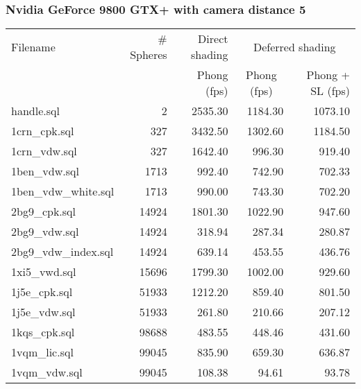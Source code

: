 \subsubsection*{Nvidia GeForce 9800 GTX+ with camera distance 5}
\begin{tabular}{|l|r|r|r|r|}
\hline
Filename & \# Spheres & Direct shading & \multicolumn{2}{|c|}{Deferred shading} \\
         &            & Phong (fps)    & \multicolumn{1}{|c}{Phong (fps)} & Phong + SL (fps) \\  
\hline
\hline
handle.sql & 2 & 2535.30 & 1184.30 & 1073.10 \\
\hline
1crn\_cpk.sql & 327 & 3432.50 & 1302.60 & 1184.50 \\
\hline
1crn\_vdw.sql & 327 & 1642.40 & 996.30 & 919.40 \\
\hline
1ben\_vdw.sql & 1713 & 992.40 & 742.90 & 702.33 \\
\hline
1ben\_vdw\_white.sql & 1713 & 990.00 & 743.30 & 702.20 \\
\hline
2bg9\_cpk.sql & 14924 & 1801.30 & 1022.90 & 947.60 \\
\hline
2bg9\_vdw.sql & 14924 & 318.94 & 287.34 & 280.87 \\
\hline
2bg9\_vdw\_index.sql & 14924 & 639.14 & 453.55 & 436.76 \\
\hline
1xi5\_vwd.sql & 15696 & 1799.30 & 1002.00 & 929.60 \\
\hline
1j5e\_cpk.sql & 51933 & 1212.20 & 859.40 & 801.50 \\
\hline
1j5e\_vdw.sql & 51933 & 261.80 & 210.66 & 207.12 \\
\hline
1kqs\_cpk.sql & 98688 & 483.55 & 448.46 & 431.60 \\
\hline
1vqm\_lic.sql & 99045 & 835.90 & 659.30 & 636.87 \\
\hline
1vqm\_vdw.sql & 99045 & 108.38 & 94.61 & 93.78 \\
\hline
\end{tabular}
